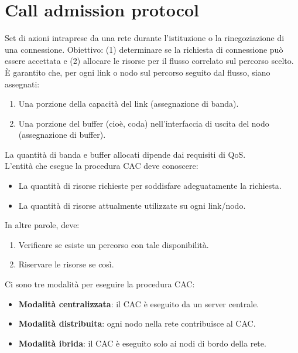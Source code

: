 \section{Call admission protocol}
Set di azioni intraprese da una rete durante l'istituzione o la rinegoziazione di una connessione. Obiettivo: (1) determinare se la richiesta di connessione può essere accettata e (2) allocare le risorse per il flusso correlato sul percorso scelto.
\\
È garantito che, per ogni link o nodo sul percorso seguito dal flusso, siano assegnati:
\begin{enumerate}
	\item Una porzione della capacità del link (assegnazione di banda).
	\item Una porzione del buffer (cioè, coda) nell'interfaccia di uscita del nodo (assegnazione di buffer).
\end{enumerate}
\bigskip
La quantità di banda e buffer allocati dipende dai requisiti di QoS.
\\
L'entità che esegue la procedura CAC deve conoscere:
\begin{itemize}
	\item La quantità di risorse richieste per soddisfare adeguatamente la richiesta.
	\item La quantità di risorse attualmente utilizzate su ogni link/nodo.
\end{itemize}

In altre parole, deve:
\begin{enumerate}
	\item Verificare se esiste un percorso con tale disponibilità.
	\item Riservare le risorse se così.
\end{enumerate}
\bigskip
Ci sono tre modalità per eseguire la procedura CAC:
\begin{itemize}
	\item \textbf{Modalità centralizzata}: il CAC è eseguito da un server centrale.
	\item \textbf{Modalità distribuita}: ogni nodo nella rete contribuisce al CAC.
	\item \textbf{Modalità ibrida}: il CAC è eseguito solo ai nodi di bordo della rete.
\end{itemize}
